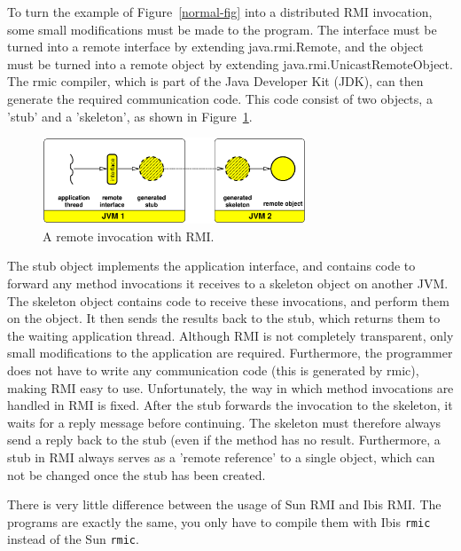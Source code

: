 \documentclass[10pt]{article}
\newcommand{\remark}[1]{[\emph{#1}]}
\begin{document}
To turn the example of Figure~\ref{normal-fig} into a distributed RMI invocation,
some small modifications must be made to the program. The interface
must be turned into a remote interface by extending java.rmi.Remote,
and the object must be turned into a remote object by extending
java.rmi.UnicastRemoteObject. The rmic compiler, which is part of the
Java Developer Kit (JDK), can then generate the required communication
code. This code consist of two objects, a 'stub' and a 'skeleton', as
shown in Figure~\ref{rmi-fig}.

\begin{figure}[t]
\begin{center}
\includegraphics[width=0.7\textwidth]{rmi-abstract.eps}
\end{center}
\caption{A remote invocation with RMI.}
\label{rmi-fig}
\end{figure}

The stub object implements the application interface, and contains
code to forward any method invocations it receives to a skeleton
object on another JVM. The skeleton object contains code to receive
these invocations, and perform them on the object. It then sends the
results back to the stub, which returns them to the waiting
application thread.  Although RMI is not completely transparent, only
small modifications to the application are required. Furthermore, the
programmer does not have to write any communication code (this is
generated by rmic), making RMI easy to use. Unfortunately, the way in
which method invocations are handled in RMI is fixed. After the stub
forwards the invocation to the skeleton, it waits for a reply message
before continuing. The skeleton must therefore always send a reply
back to the stub (even if the method has no result. Furthermore, a
stub in RMI always serves as a 'remote reference' to a single object,
which can not be changed once the stub has been created.

There is very little difference between the usage of Sun RMI and Ibis
RMI. The programs are exactly the same, you only have to compile them
with Ibis \texttt{rmic} instead of the Sun \texttt{rmic}. 

\end{document}
